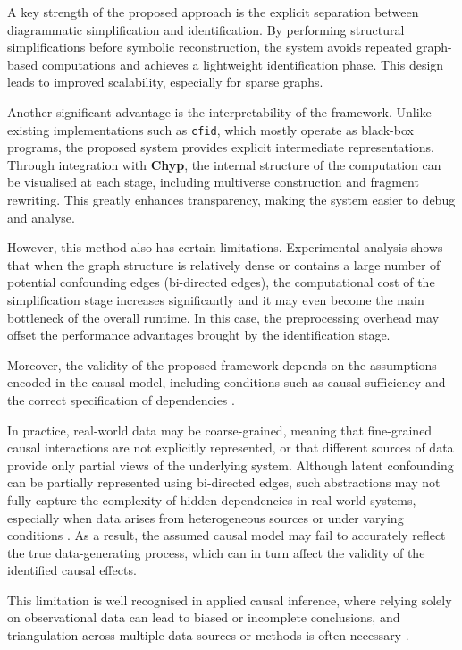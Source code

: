 \documentclass[a4paper]{report}
\begin{document}
A key strength of the proposed approach is the explicit separation between diagrammatic simplification and identification. By performing structural simplifications before
symbolic reconstruction, the system avoids repeated graph-based computations and achieves a lightweight identification phase. This design leads to improved scalability, especially for sparse graphs.

Another significant advantage is the interpretability of the framework. Unlike existing implementations such as \texttt{cfid}, which mostly operate as black-box programs, the proposed system provides explicit intermediate representations. Through integration with \textbf{Chyp}, the internal structure of the computation can be visualised at each stage, including multiverse construction and fragment rewriting. This greatly enhances transparency, making the system easier to debug and analyse. 

However, this method also has certain limitations. Experimental analysis shows that when the graph structure is relatively dense or contains a large number of potential confounding edges (bi-directed edges), the computational cost of the simplification stage increases significantly and it may even become the main bottleneck of the overall runtime. In this case, the preprocessing overhead may offset the performance advantages brought by the identification stage.

Moreover, the validity of the proposed framework depends on the assumptions encoded in the causal model, including conditions such as causal sufficiency and the correct specification of dependencies \cite{causal-sufficiency}.

In practice, real-world data may be coarse-grained, meaning that fine-grained causal interactions are not explicitly represented,
or that different sources of data provide only partial views of the underlying system. Although latent confounding can be partially represented using bi-directed edges, such abstractions may not fully capture the complexity of hidden dependencies in real-world systems, especially when data arises from heterogeneous sources or under varying conditions \cite{bareinboim2016causal}. As a result, the assumed causal model may fail to accurately reflect the true data-generating process, which can in turn affect the validity of the identified causal effects.

This limitation is well recognised in applied causal inference,
where relying solely on observational data can lead to biased or incomplete conclusions, and triangulation across multiple data sources or methods is often necessary \cite{hammerton2021causal}.
    
\end{document}
